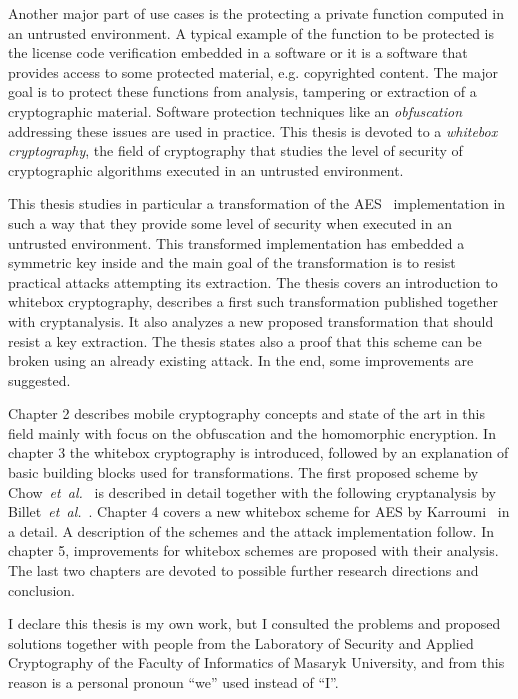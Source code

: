 \documentclass[11pt,oneside,final]{fithesis2}
\newcommand{\eal}{\emph{et~al.}}
\begin{document}
    Another major part of use cases is the protecting a private function computed in an untrusted environment. A typical example
    of the function to be protected is the license code verification embedded in a software or it is a software that provides access 
    to some protected material, e.g. copyrighted content.  The major goal is to protect these
    functions from analysis, tampering or extraction of a cryptographic material. Software protection techniques like an \emph{obfuscation}
    addressing these issues are used in practice. This thesis is devoted to a \emph{whitebox cryptography}, the field of 
    cryptography that studies the level of security of cryptographic algorithms executed in an untrusted environment.

    This thesis studies in particular a transformation of the AES~\citep{2002-daemen} implementation in such a way that they provide some
    level of security when executed in an untrusted environment. This transformed implementation has embedded a symmetric key inside
    and the main goal of the transformation is to resist practical attacks attempting its extraction. The thesis covers an introduction
    to whitebox cryptography, describes a first such transformation published together with cryptanalysis. It also analyzes a new 
    proposed transformation that should resist a key extraction. The thesis states also a proof that this scheme can be broken 
    using an already existing attack. In the end, some improvements are suggested.

    Chapter 2 describes mobile cryptography concepts and state of the art in this field mainly with focus on the obfuscation and the homomorphic encryption.
    In chapter 3 the whitebox cryptography is introduced, followed by an explanation of basic building blocks used for transformations. The first proposed scheme 
    by Chow~\eal~\citep{Chow02white-boxcryptography} is described in detail together with the following cryptanalysis by Billet~\eal~\citep{Billet:2004:CWB:2080787.2080809}.
    Chapter 4 covers a new whitebox scheme for AES by Karroumi~\citep{Karroumi:2010:PWA:2041036.2041060} in a detail. 
    A description of the schemes and the attack implementation follow. 
    In chapter 5, improvements for whitebox schemes are proposed with their analysis. The last two chapters are devoted to possible further 
    research directions and conclusion.

    I declare this thesis is my own work, but I consulted the problems and proposed solutions together with people from the 
    Laboratory of Security and Applied Cryptography of the
    Faculty of Informatics of Masaryk University, and from this reason is a personal pronoun ``we'' used instead of ``I''.
\end{document}
